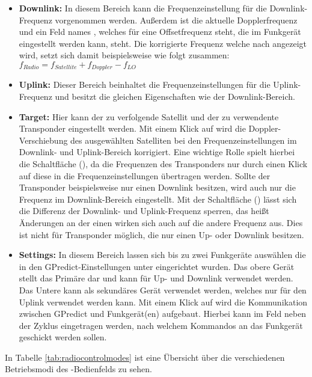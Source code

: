 \begin{itemize}
	\parskip0pt
	\item \textbf{Downlink:} In diesem Bereich kann die Frequenzeinstellung für die Downlink-Frequenz vorgenommen werden. Außerdem ist die aktuelle Dopplerfrequenz und ein Feld names , welches für eine Offsetfrequenz steht, die im Funkgerät eingestellt werden kann, steht. Die korrigierte Frequenz welche nach  angezeigt wird, setzt sich damit beispielsweise wie folgt zusammen: $f_{Radio} = f_{Satellite} + f_{Doppler} - f_{LO}$
	\item \textbf{Uplink:} Dieser Bereich beinhaltet die Frequenzeinstellungen für die Uplink-Frequenz und besitzt die gleichen Eigenschaften wie der Downlink-Bereich.
	\item \textbf{Target:} Hier kann der zu verfolgende Satellit und der zu verwendente Transponder eingestellt werden. Mit einem Klick auf  wird die Doppler-Verschiebung des ausgewählten Satelliten bei den Frequenzeinstellungen im Downlink- und Uplink-Bereich korrigiert. Eine wichtige Rolle spielt hierbei die Schaltfläche  (), da die Frequenzen des Transponders nur durch einen Klick auf diese in die Frequenzeinstellungen übertragen werden. Sollte der Transponder beispielsweise nur einen Downlink besitzen, wird auch nur die Frequenz im Downlink-Bereich eingestellt.
	Mit der Schaltfläche  () lässt sich die Differenz der Downlink- und Uplink-Frequenz sperren, das heißt Änderungen an der einen wirken sich auch auf die andere Frequenz aus. Dies ist nicht für Transponder möglich, die nur einen Up- oder Downlink besitzen.
	\item \textbf{Settings:} In diesem Bereich lassen sich bis zu zwei Funkgeräte auswählen die in den GPredict-Einstellungen unter  eingerichtet wurden. Das obere Gerät stellt das Primäre dar und kann für Up- und Downlink verwendet werden. Das Untere kann als sekundäres Gerät verwendet werden, welches nur für den Uplink verwendet werden kann. Mit einem Klick auf  wird die Kommunikation zwischen GPredict und Funkgerät(en) aufgebaut. Hierbei kann im Feld neben  der Zyklus eingetragen werden, nach welchem Kommandos an das Funkgerät geschickt werden sollen.
\end{itemize}

In Tabelle \ref{tab:radiocontrolmodes} ist eine Übersicht über die verschiedenen Betriebsmodi des -Bedienfelds zu sehen.

